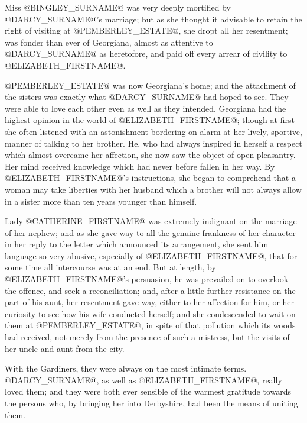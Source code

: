Miss @BINGLEY_SURNAME@ was very deeply mortified by @DARCY_SURNAME@'s marriage; but as she
thought it advisable to retain the right of visiting at @PEMBERLEY_ESTATE@, she
dropt all her resentment; was fonder than ever of Georgiana, almost as
attentive to @DARCY_SURNAME@ as heretofore, and paid off every arrear of civility
to @ELIZABETH_FIRSTNAME@.

@PEMBERLEY_ESTATE@ was now Georgiana's home; and the attachment of the sisters
was exactly what @DARCY_SURNAME@ had hoped to see. They were able to love each
other even as well as they intended. Georgiana had the highest opinion
in the world of @ELIZABETH_FIRSTNAME@; though at first she often listened with
an astonishment bordering on alarm at her lively, sportive, manner of
talking to her brother. He, who had always inspired in herself a respect
which almost overcame her affection, she now saw the object of open
pleasantry. Her mind received knowledge which had never before fallen
in her way. By @ELIZABETH_FIRSTNAME@'s instructions, she began to comprehend that
a woman may take liberties with her husband which a brother will not
always allow in a sister more than ten years younger than himself.

Lady @CATHERINE_FIRSTNAME@ was extremely indignant on the marriage of her nephew;
and as she gave way to all the genuine frankness of her character in
her reply to the letter which announced its arrangement, she sent him
language so very abusive, especially of @ELIZABETH_FIRSTNAME@, that for some time
all intercourse was at an end. But at length, by @ELIZABETH_FIRSTNAME@'s persuasion,
he was prevailed on to overlook the offence, and seek a reconciliation;
and, after a little further resistance on the part of his aunt, her
resentment gave way, either to her affection for him, or her curiosity
to see how his wife conducted herself; and she condescended to wait
on them at @PEMBERLEY_ESTATE@, in spite of that pollution which its woods had
received, not merely from the presence of such a mistress, but the
visits of her uncle and aunt from the city.

With the Gardiners, they were always on the most intimate terms.
@DARCY_SURNAME@, as well as @ELIZABETH_FIRSTNAME@, really loved them; and they were both ever
sensible of the warmest gratitude towards the persons who, by bringing
her into Derbyshire, had been the means of uniting them.